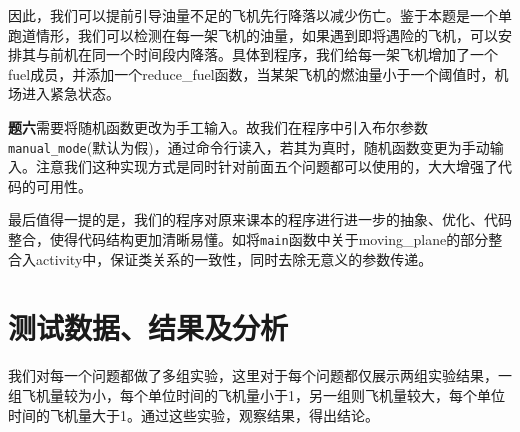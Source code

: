 \documentclass[12pt,UTF8]{ctexart}
\begin{document}
\begin{spacing}{1.4}
	因此，我们可以提前引导油量不足的飞机先行降落以减少伤亡。鉴于本题是一个单跑道情形，我们可以检测在每一架飞机的油量，如果遇到即将遇险的飞机，可以安排其与前机在同一个时间段内降落。具体到程序，我们给每一架飞机增加了一个fuel成员，并添加一个reduce\_fuel函数，当某架飞机的燃油量小于一个阈值时，机场进入紧急状态。
	
	\textbf{题六}需要将随机函数更改为手工输入。故我们在程序中引入布尔参数\verb'manual_mode'(默认为假)，通过命令行读入，若其为真时，随机函数变更为手动输入。注意我们这种实现方式是同时针对前面五个问题都可以使用的，大大增强了代码的可用性。

	最后值得一提的是，我们的程序对原来课本的程序进行进一步的抽象、优化、代码整合，使得代码结构更加清晰易懂。如将\verb'main'函数中关于moving\_plane的部分整合入activity中，保证类关系的一致性，同时去除无意义的参数传递。

\section{测试数据、结果及分析}
\label{sec:exp}
我们对每一个问题都做了多组实验，这里对于每个问题都仅展示两组实验结果，一组飞机量较为小，每个单位时间的飞机量小于1，另一组则飞机量较大，每个单位时间的飞机量大于1。通过这些实验，观察结果，得出结论。


\end{spacing}
\end{document}
